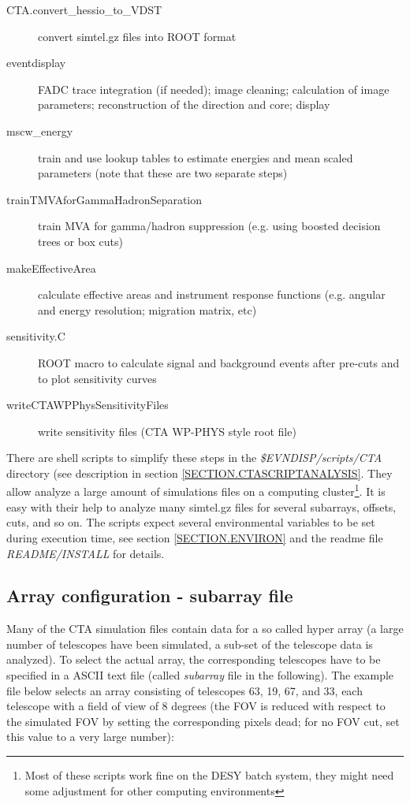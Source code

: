 \documentclass[titlepage,a4paper,twoside,11pt]{report}
\begin{document}
\begin{description}
\item[CTA.convert\_hessio\_to\_VDST]
        convert simtel.gz files into ROOT format

\item[eventdisplay]
	FADC trace integration (if needed); image cleaning; calculation of image parameters; reconstruction of the direction and core; display

\item[mscw\_energy]
        train and use lookup tables to estimate energies and mean scaled parameters (note that these are two separate steps)
        
\item[trainTMVAforGammaHadronSeparation]
        train MVA for gamma/hadron suppression (e.g. using boosted decision trees or box cuts)

\item[makeEffectiveArea]
        calculate effective areas and instrument response functions (e.g. angular and energy resolution; migration matrix, etc)

\item[sensitivity.C]
        ROOT macro to calculate signal and background events after pre-cuts and to plot sensitivity curves

\item[writeCTAWPPhysSensitivityFiles]
        write sensitivity files (CTA WP-PHYS style root file)
        
\end{description}

There are shell scripts to simplify these steps in the {\it \$EVNDISP/scripts/CTA} directory (see description in section \ref{SECTION.CTASCRIPTANALYSIS}.
They allow analyze a large amount of simulations files on a computing cluster\footnote{Most of these scripts work fine on the DESY batch system, they might need some adjustment for other computing environments}.
It is easy with their help to analyze many simtel.gz files for several subarrays, offsets, cuts, and so on. 
The scripts expect several environmental variables to be set during execution time, see section \ref{SECTION.ENVIRON} and the readme file {\it README/INSTALL} for details.

\subsection{Array configuration - subarray file}

Many of the CTA simulation files contain data for a so called hyper array 
(a large number of telescopes have been simulated, a sub-set of the telescope data is analyzed).
To select the actual array, the corresponding telescopes have to be specified in a ASCII text file (called {\it subarray} file in the following).
The  example file below selects an array consisting of telescopes 63, 19, 67, and 33, each telescope
with a field of view of 8 degrees (the FOV is reduced with respect to the simulated FOV by setting the corresponding pixels dead; for no FOV cut, set this value to a very large number):
\end{document}
